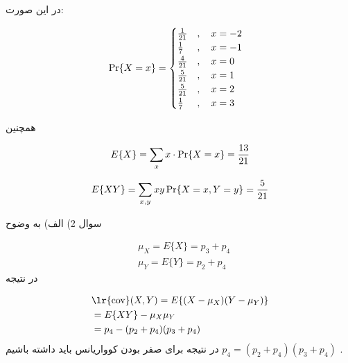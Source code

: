 \documentclass[10pt,letterpaper]{report}
\newcommand{\eqn}[1]{
\[\begin{split}
#1
\end{split}\]
}
\begin{document}
در این صورت:
\eqn{
&\Pr\{X=x\}=\begin{cases}
{1\over 21}&,\quad x=-2\\
{1\over 7}&,\quad x=-1\\
{4\over 21}&,\quad x=0\\
{5\over 21}&,\quad x=1\\
{5\over 21}&,\quad x=2\\
{1\over 7}&,\quad x=3\\
\end{cases}
}

همچنین
\eqn{
E\{X\}=\sum_x x\cdot\Pr\{X=x\}={13\over 21}
}

\eqn{
E\{XY\}=\sum_{x,y} xy\Pr\{X=x,Y=y\}={5\over21}
}

سوال 2) الف) به وضوح 
\eqn{
&\mu_X=E\{X\}=p_3+p_4
\\&\mu_Y=E\{Y\}=p_2+p_4
}{}
در نتیجه
\eqn{
&\text{\lr{cov}}(X,Y)=E\{(X-\mu_X)(Y-\mu_Y)\}
\\&=E\{XY\}-\mu_X\mu_Y
\\&=p_4-(p_2+p_4)(p_3+p_4)
}{}
در نتیجه برای صفر بودن کوواریانس باید داشته باشیم 
$
p_4=(p_2+p_4)(p_3+p_4)
$
.
\end{document}

